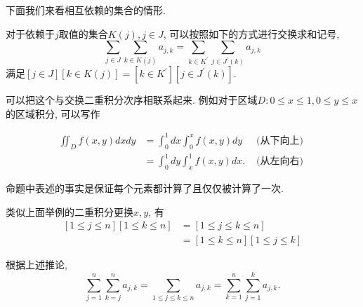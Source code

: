 \documentclass{ctexart}
\begin{document}
下面我们来看相互依赖的集合的情形.

\begin{proposition}
	对于依赖于$j$取值的集合$K(j),j\in J$, 可以按照如下的方式进行交换求和记号,
	$$
		\sum_{j \in J} \sum_{k \in K(j)} a_{j, k}=\sum_{k \in K^{\prime}} \sum_{j \in J^{\prime}(k)} a_{j, k}
	$$
	满足$[j \in J][k \in K(j)]=\left[k \in K^{\prime}\right]\left[j \in J^{\prime}(k)\right]$.
\end{proposition}

\begin{remark}
	可以把这个与交换二重积分次序相联系起来. 例如对于区域$D:0\leq x\leq 1, 0\leq y\leq x$的区域积分, 可以写作

	$$
		\begin{aligned}
			\iint_D f(x, y) d x d y & =\int_0^1 d x \int_0^x f(x, y) d y   & \text { (从下向上) } \\
			                        & =\int_0^1 d y \int_x^1 f(x, y) d x . & \text { (从左向右) }
		\end{aligned}
	$$

	命题中表述的事实是保证每个元素都计算了且仅仅被计算了一次.
\end{remark}

\begin{corollary}
	类似上面举例的二重积分更换$x,y$, 有
	$$
		\begin{aligned}
			{[1 \leqslant j \leqslant n][1 \leqslant k \leqslant n] } & =[1 \leqslant j \leqslant k \leqslant n]                \\
			                                                          & =[1 \leqslant k \leqslant n][1 \leqslant j \leqslant k]
		\end{aligned}
	$$
\end{corollary}

\begin{example}
	根据上述推论,
	$$
		\sum_{j=1}^n \sum_{k=j}^n a_{j, k}=\sum_{1 \leqslant j \leqslant k \leqslant n} a_{j, k}=\sum_{k=1}^n \sum_{j=1}^k a_{j, k} .
	$$
\end{example}
\end{document}
